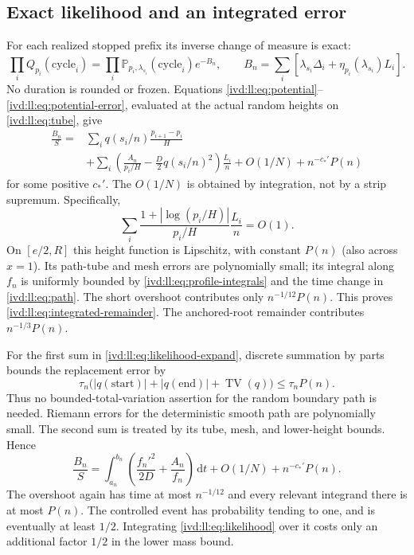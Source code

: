 \documentclass[11pt,letterpaper]{article}
\theoremstyle{remark}\newtheorem{remark}[theorem]{Remark}
\numberwithin{equation}{section}
\newcommand{\Prob}{\mathbb P}\newcommand{\E}{\mathbb E}
\DeclareMathOperator{\TV}{TV}
\newcommand{\dd}{\,\mathrm d}
\begin{document}
\subsection{Exact likelihood and an integrated error}
For each realized stopped prefix its inverse change of measure is
exact:
\begin{equation}\label{ivd:ll:eq:likelihood}
 \prod_i Q_{p_i}(\text{cycle}_i)
 =\prod_i\Prob_{p_i,\lambda_{s_i}}(\text{cycle}_i)e^{-B_n},
 \qquad
 B_n=\sum_i[\lambda_{s_i}\Delta_i+
                    \eta_{p_i}(\lambda_{s_i})L_i].
\end{equation}
No duration is rounded or frozen. Equations
\eqref{ivd:ll:eq:potential}--\eqref{ivd:ll:eq:potential-error}, evaluated at the
actual random heights on \eqref{ivd:ll:eq:tube}, give
\begin{align}\label{ivd:ll:eq:likelihood-expand}
 \frac{B_n}S={}&\sum_iq(s_i/n)\frac{p_{i+1}-p_i}{H}\nonumber\\
 &+\sum_i\left(\frac{A_n}{p_i/H}-\frac D2q(s_i/n)^2\right)
                   \frac{L_i}n+O(1/N)+n^{-c_*'}P(n)
\end{align}
for some positive $c_*'$. The $O(1/N)$ is obtained by integration,
not by a strip supremum. Specifically,
\begin{equation}\label{ivd:ll:eq:integrated-remainder}
 \sum_i\frac{1+|\log(p_i/H)|}{p_i/H}\frac{L_i}n=O(1).
\end{equation}
On $[e/2,R]$ this height function is Lipschitz, with constant
$P(n)$ (also across $x=1$). Its path-tube and mesh errors are
polynomially small; its integral along $f_n$ is uniformly bounded
by \eqref{ivd:ll:eq:profile-integrals} and the time change in
\eqref{ivd:ll:eq:path}. The short overshoot contributes only
$n^{-1/12}P(n)$. This proves \eqref{ivd:ll:eq:integrated-remainder}.
The anchored-root remainder contributes $n^{-1/3}P(n)$.

For the first sum in \eqref{ivd:ll:eq:likelihood-expand}, discrete
summation by parts bounds the replacement error by
\[
 \tau_n\big(|q(\text{start})|+|q(\text{end})|+\TV(q)\big)
 \le\tau_nP(n).
\]
Thus no bounded-total-variation assertion for the random boundary
path is needed. Riemann errors for the deterministic smooth path
are polynomially small. The second sum is treated by its tube,
mesh, and lower-height bounds. Hence
\begin{equation}\label{ivd:ll:eq:likelihood-action}
 \frac{B_n}S=\int_{a_n}^{b_n}
      \left(\frac{f_n'^2}{2D}+\frac{A_n}{f_n}\right)\dd t
                  +O(1/N)+n^{-c_*'}P(n).
\end{equation}
The overshoot again has time at most $n^{-1/12}$ and every relevant
integrand there is at most $P(n)$.
The controlled event has probability tending to one, and is eventually
at least $1/2$. Integrating \eqref{ivd:ll:eq:likelihood} over it costs
only an additional factor $1/2$ in the lower mass bound.
\end{document}
